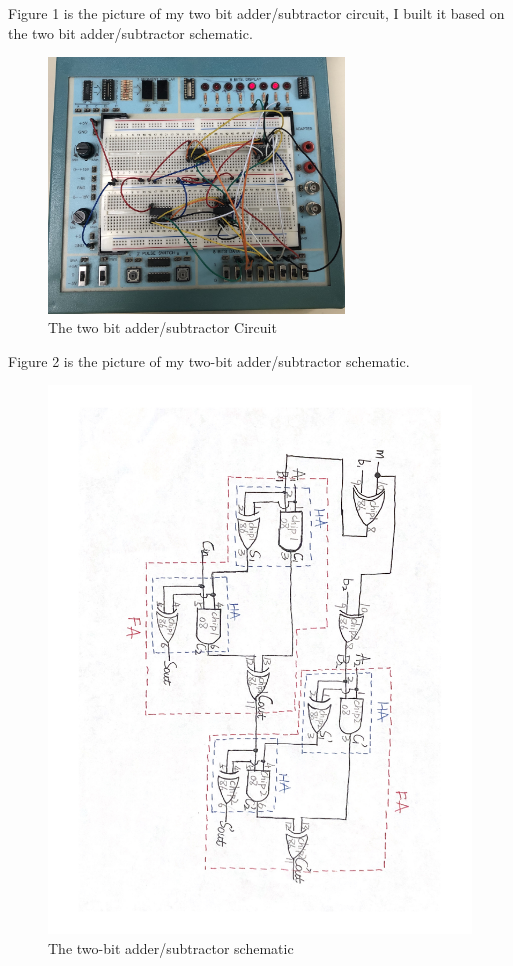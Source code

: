 \documentclass[11pt]{article}
\begin{document}
	Figure 1 is the picture of my two bit adder/subtractor circuit, I built it based on the two bit adder/subtractor schematic.\\
	\begin{figure}[ht]\centering
		\includegraphics[width=0.7\textwidth,trim=5cm 5cm 5cm 5cm,clip]{2-bitSubtractor}
		\caption{The  two bit adder/subtractor Circuit}
		\label{fig:2-bitSubtractor}
	\end{figure}
	
	Figure 2 is the picture of my two-bit adder/subtractor schematic.\\
	\begin{figure}[ht]\centering
		\includegraphics[width=1.0\textwidth]{Schematic}
		\caption{The two-bit adder/subtractor schematic}
		\label{fig:Schematic}
	\end{figure}
	
\end{document}
